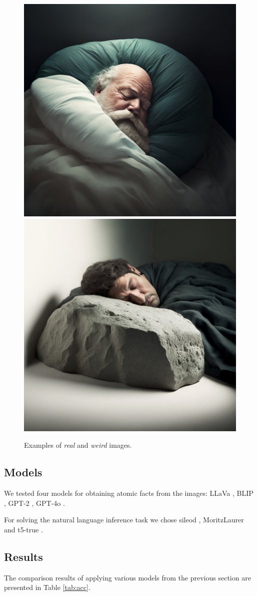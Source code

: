 \documentclass[11pt]{article}
\begin{document}
\begin{figure}[t]
  \includegraphics[width=0.48\linewidth]{images/sleep_1.png} \hfill
  \includegraphics[width=0.48\linewidth]{images/sleep_0.png}
  \caption {Examples of \textit{real} and \textit{weird} images.}
  \label{fig:data}
\end{figure}

\subsection{Models}

We tested four models for obtaining atomic facts from the images: 
LLaVa \cite{liu2023llava}, BLIP \cite{blip}, GPT-2 \cite{gpt2}, GPT-4o \cite{OpenAI_GPT4_2023}.

For solving the natural language inference task we chose sileod \cite{sileod22-tasknet}, MoritzLaurer \cite{laurer_less_2022} and t5-true \cite{honovich-etal-2022-true-evaluating}.

\subsection{Results}

The comparison results of applying various models from the previous section are presented in Table \ref{tab:acc}.
\end{document}
